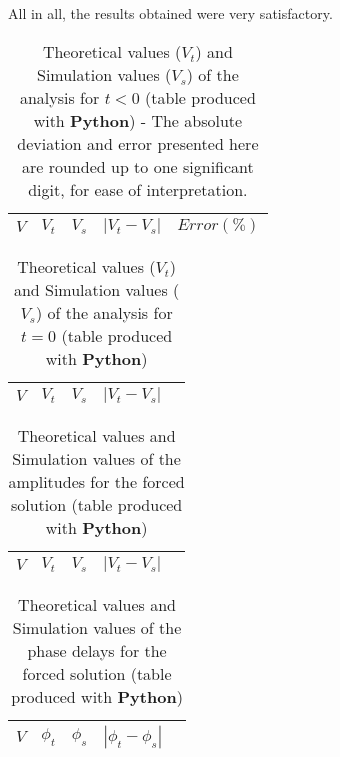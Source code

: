 
All in all, the results obtained were very satisfactory.

\begin{table}[H]
  \centering
  \begin{tabular}{|c|c|c|c|c|}
    \hline
        $V$ & $V_t$ & $V_s$ & $|V_t-V_s|$ & $Error (\%)$ \\
        \hline
        \hline
        
        \hline
  \end{tabular}
  \caption{Theoretical values ($V_t$) and Simulation values ($V_s$) of the analysis for $t < 0$ (table produced with {\bf Python}) - The absolute deviation and error presented here are rounded up to one significant digit, for ease of interpretation.}
  \label{error1_res}
\end{table}

\begin{table}[H]
  \centering
  \begin{tabular}{|c|c|c|c|c|}
    \hline
        $V$ & $V_t$ & $V_s$ & $|V_t-V_s|$ \\
        \hline
        \hline
        
        \hline
  \end{tabular}
  \caption{Theoretical values ($V_t$) and Simulation values ($V_s$) of the analysis for $t = 0$ (table produced with {\bf Python})}
  \label{error2_res}
\end{table}

\begin{table}[H]
  \centering
  \begin{tabular}{|c|c|c|c|c|}
    \hline
        $V$ & $V_t$ & $V_s$ & $|V_t-V_s|$ \\
        \hline
        \hline
        
        \hline
  \end{tabular}
  \caption{Theoretical values and Simulation values of the amplitudes for the forced solution (table produced with {\bf Python})}
  \label{error4a_res}
\end{table}

\begin{table}[H]
  \centering
  \begin{tabular}{|c|c|c|c|c|}
    \hline
        $V$ & $\phi_t$ & $\phi_s$ & $|\phi_t-\phi_s|$ \\
        \hline
        \hline
        
        \hline
  \end{tabular}
  \caption{Theoretical values and Simulation values of the phase delays for the forced solution (table produced with {\bf Python})}
  \label{error4f_res}
\end{table}

